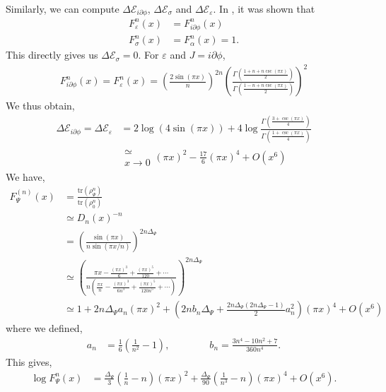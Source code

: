 \documentclass[11pt]{article}
\newcommand{\p}{\partial}
\newcommand{\lb}{\left(}
\newcommand{\rb}{\right)}
\begin{document}
Similarly, we can compute $\Delta \mathcal{E}_{i\p\phi}$, $\Delta \mathcal{E}_{\sigma}$ and $\Delta\mathcal{E}_\varepsilon$. In \cite{Calabrese_2014, Essler_2013, Nakagawa_2017}, it was shown that 
\begin{align}
    F_\varepsilon^n(x) &= F_{i\p\phi}^n(x) \\
    F_\sigma^n(x) &= F_\alpha^n(x) = 1.
\end{align}
This directly gives us $\Delta \mathcal{E}_\sigma = 0$. 
For $\varepsilon$ and $J = i\p\phi$, 
\begin{align}
    F_{i\p\phi}^n(x) = F_\varepsilon^n(x) = \lb\frac{2\sin(\pi x)}{n}\rb^{2n} \lb\frac{\Gamma\lb\frac{1+n+n\csc(\pi x)}{2}\rb}{\Gamma\lb\frac{1-n+n\csc(\pi x)}{2}\rb}\rb^2
\end{align}
We thus obtain,
\begin{align}
    \Delta \mathcal{E}_{i\p\phi}= \Delta \mathcal{E}_{\varepsilon} &= 2\log \lb4\sin(\pi x)\rb +4\log \frac{\Gamma\lb\frac{3+\csc(\pi x)}{4}\rb}{\Gamma\lb\frac{1+\csc(\pi x)}{4}\rb} \\
    &\substack{\simeq \\x\to 0} (\pi x)^2 - \frac{17}{6}(\pi x)^4 + O(x^6)
\end{align}
We have,
\begin{align}
    F^{(n)}_\Psi(x) &= \frac{\text{tr}(\rho_\Psi^n)}{\text{tr}(\rho_0^n)} \\
    &\simeq D_n(x)^{-n} \\
    &= \lb\frac{\sin(\pi x)}{n\sin(\pi x/n)}\rb^{2n\Delta_\Psi} \\
    &\simeq \lb\frac{\pi x -\frac{(\pi x)^3}{6} + \frac{(\pi x)^5}{120}+\cdots } {n \lb \frac{\pi x }{n} - \frac{(\pi x)^3}{6n^3} +\frac{(\pi x)^5}{120n^5}+ \cdots\rb  }\rb^{2n\Delta_\Psi}\\
    &\simeq 1+ 2n\Delta_\Psi a_n (\pi x)^2 + \lb2n b_n \Delta_\Psi + \frac{2n\Delta_\Psi \lb2n\Delta_\Psi - 1\rb}{2}a_n^2\rb (\pi x)^4+O(x^6)
\end{align}
where we defined,
\begin{align}
    a_n&= \frac{1}{6}\lb\frac{1}{n^2}-1\rb, \qquad\qquad 
    b_n= \frac{3n^4 -10n^2 +7}{360n^4}.
\end{align}
This gives,
\begin{align}
    \log F_\Psi^n(x) &= \frac{\Delta_\Psi}{3}\lb\frac{1}{n}-n\rb(\pi x)^2 + \frac{\Delta_\Psi}{90}\lb\frac{1}{n^3}-n\rb(\pi x)^4 + O(x^6).
\end{align}
\end{document}
